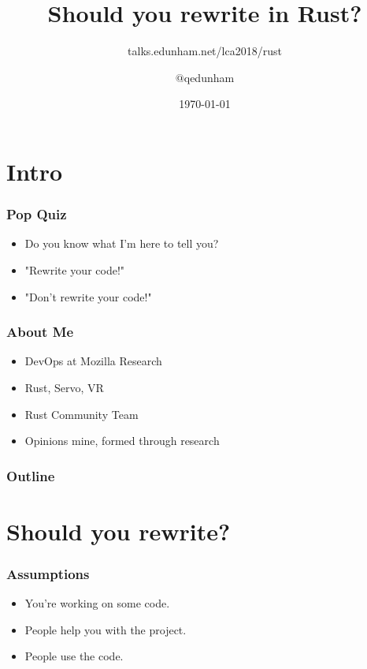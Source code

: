 \documentclass{beamer}
\title{Should you rewrite in Rust?}
\subtitle{talks.edunham.net/lca2018/rust}
\author{$@$qedunham}
\institute{LinuxConf Australia}
\date{\today}
\begin{document}
\begin{frame}[fragile]
\titlepage
\end{frame}


\section{Intro}

\begin{frame}[fragile]
\frametitle{Pop Quiz}
\begin{itemize}[<+(1)->]
\item Do you know what I'm here to tell you?
\item "Rewrite your code!"
\item "Don't rewrite your code!"
\end{itemize}
\end{frame}


\begin{frame}[fragile]
\frametitle{About Me}
\begin{itemize}[<+(1)->]
\item DevOps at Mozilla Research
\item Rust, Servo, VR
\item Rust Community Team
\item Opinions mine, formed through research
\end{itemize}
\end{frame}

\begin{frame}[fragile]
\frametitle{Outline}
\tableofcontents[pausesections]
\end{frame}

\section{Should you rewrite?}

\begin{frame}[fragile]
\tableofcontents[currentsection]
\end{frame}

\begin{frame}[fragile]
\frametitle{Assumptions}
\begin{itemize}[<+(1)->]
\item You're working on some code.
\item People help you with the project.
\item People use the code.
\end{itemize}
\end{frame}
\end{document}
